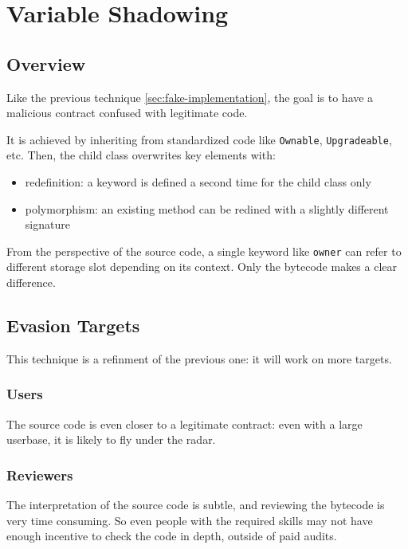 \section{Variable Shadowing} \label{sec:variable-shadowing}

\subsection{Overview}

Like the previous technique \ref{sec:fake-implementation}, the goal is to have a malicious contract confused with legitimate code.

It is achieved by inheriting from standardized code like \lstinline{Ownable}, \lstinline{Upgradeable}, etc.
Then, the child class overwrites key elements with:

\begin{itemize}
\item{redefinition: a keyword is defined a second time for the child class only}
\item{polymorphism: an existing method can be redined with a slightly different signature}
\end{itemize}

From the perspective of the source code, a single keyword like \lstinline{owner} can refer to different storage slot depending on its context.
Only the bytecode makes a clear difference.

\subsection{Evasion Targets}

This technique is a refinment of the previous one: it will work on more targets.

\subsubsection{Users}

The source code is even closer to a legitimate contract: even with a large userbase, it is likely to fly under the radar.

\subsubsection{Reviewers}

The interpretation of the source code is subtle, and reviewing the bytecode is very time consuming.
So even people with the required skills may not have enough incentive to check the code in depth, outside of paid audits.

